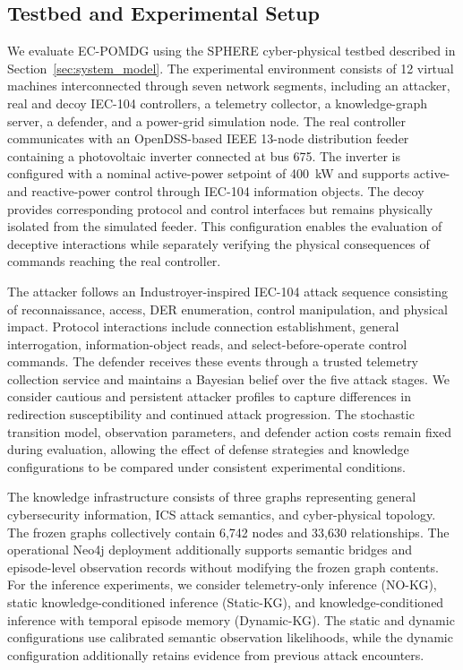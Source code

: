 \documentclass[10pt,conference]{IEEEtran}
\begin{document}
\subsection{Testbed and Experimental Setup}

We evaluate EC-POMDG using the SPHERE cyber-physical testbed described in Section~\ref{sec:system_model}. The experimental environment consists of 12 virtual machines interconnected through seven network segments, including an attacker, real and decoy IEC-104 controllers, a telemetry collector, a knowledge-graph server, a defender, and a power-grid simulation node. The real controller communicates with an OpenDSS-based IEEE 13-node distribution feeder containing a photovoltaic inverter connected at bus 675. The inverter is configured with a nominal active-power setpoint of 400~kW and supports active- and reactive-power control through IEC-104 information objects. The decoy provides corresponding protocol and control interfaces but remains physically isolated from the simulated feeder. This configuration enables the evaluation of deceptive interactions while separately verifying the physical consequences of commands reaching the real controller.

The attacker follows an Industroyer-inspired IEC-104 attack sequence consisting of reconnaissance, access, DER enumeration, control manipulation, and physical impact. Protocol interactions include connection establishment, general interrogation, information-object reads, and select-before-operate control commands. The defender receives these events through a trusted telemetry collection service and maintains a Bayesian belief over the five attack stages. We consider cautious and persistent attacker profiles to capture differences in redirection susceptibility and continued attack progression. The stochastic transition model, observation parameters, and defender action costs remain fixed during evaluation, allowing the effect of defense strategies and knowledge configurations to be compared under consistent experimental conditions.

The knowledge infrastructure consists of three graphs representing general cybersecurity information, ICS attack semantics, and cyber-physical topology. The frozen graphs collectively contain 6,742 nodes and 33,630 relationships. The operational Neo4j deployment additionally supports semantic bridges and episode-level observation records without modifying the frozen graph contents. For the inference experiments, we consider telemetry-only inference (NO-KG), static knowledge-conditioned inference (Static-KG), and knowledge-conditioned inference with temporal episode memory (Dynamic-KG). The static and dynamic configurations use calibrated semantic observation likelihoods, while the dynamic configuration additionally retains evidence from previous attack encounters.
\end{document}
